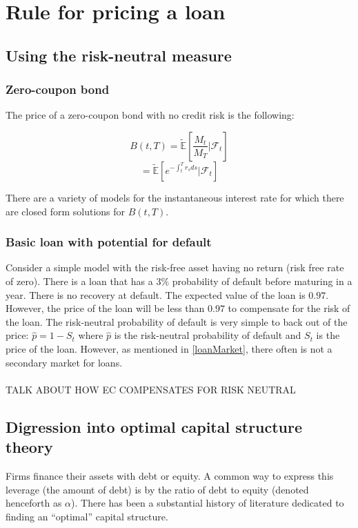 \documentclass{article}
\theoremstyle{definition}
\begin{document}
\section{Rule for pricing a loan}

\subsection{Using the risk-neutral measure}

\subsubsection{Zero-coupon bond}
The price of a zero-coupon bond with no credit risk is the following:

\[B(t, T)=\mathbb{\tilde{E}}\left[\frac{M_t}{M_T}|\mathcal{F}_t\right]\]
\[=\mathbb{\tilde{E}}\left[e^{-\int_t ^ T r_s ds}|\mathcal{F}_t\right]\]

There are a variety of models for the instantaneous interest rate for which there are closed form solutions for \(B(t, T)\).  

\subsubsection{Basic loan with potential for default}
Consider a simple model with the risk-free asset having no return (risk free rate of zero). There is a loan that has a \(3\%\) probability of default before maturing in a year.  There is no recovery at default.  The expected value of the loan is \(0.97\).  However, the price of the loan will be less than \(0.97\) to compensate for the risk of the loan.  The risk-neutral probability of default is very simple to back out of the price: \(\hat{p}=1-S_t\) where \(\hat{p}\) is the risk-neutral probability of default and \(S_t\) is the price of the loan.  However, as mentioned in \ref{loanMarket}, there often is not a secondary market for loans.  
\\
\\
TALK ABOUT HOW EC COMPENSATES FOR RISK NEUTRAL
\subsection{Digression into optimal capital structure theory}
Firms finance their assets with debt or equity.  A common way to express this leverage (the amount of debt) is by the ratio of debt to equity (denoted henceforth as \(\alpha\)).  There has been a substantial history of literature dedicated to finding an ``optimal'' capital structure.  
\end{document}
